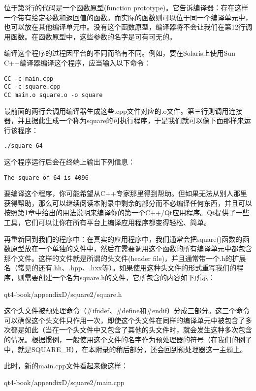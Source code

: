 \documentclass[11pt,oneside]{book}
\begin{document}
\begin{common-format}
位于第3行的代码是一个函数原型(function prototype)。它告诉编译器：存在这样一个带有给定参数和返回值的函数。而实际的函数则可以位于同一个编译单元中，也可以放在其他编译单元中。没有这个函数原型，编译器将不会让我们在第12行调用函数。在函数原型中，这些参数的名字是可有可无的。

编译这个程序的过程因平台的不同而略有不同。例如，要在Solaris上使用Sun C++编译器编译这个程序，应当输入以下命令：
\begin{Verbatim}
CC -c main.cpp
CC -c square.cpp
CC main.o square.o -o square
\end{Verbatim}

最前面的两行会调用编译器生成这些.cpp文件对应的.o文件。第三行则调用连接器，并且据此生成一个称为square的可执行程序，于是我们就可以像下面那样来运行该程序：
\begin{Verbatim}
./square 64
\end{Verbatim}

这个程序运行后会在终端上输出下列信息：
\begin{Verbatim}
The square of 64 is 4096
\end{Verbatim}

要编译这个程序，你可能希望从C++专家那里得到帮助。但如果无法从别人那里获得帮助，那么可以继续阅读本附录中剩余的部分而不必编译任何东西，并且可以按照第1章中给出的用法说明来编译你的第一个C++/Qt应用程序。Qt提供了一些工具，它们可以让你在所有平台上编译应用程序都变得轻松、简单。

再重新回到我们的程序中：在真实的应用程序中，我们通常会把square()函数的函数原型放在一个单独的文件中，然后在需要调用这个函数的所有编译单元中都包含那个文件。这样的文件就是所谓的头文件(header file)，并且通常带一个.h的扩展名（常见的还有.hh、.hpp、.hxx等）。如果使用这种头文件的形式重写我们的程序，则需要创建一个名为square.h的文件，它所包含的内容如下所示：

\begin{cppinput}{qt4-book/appendixD/square2/square.h}
\end{cppinput}

这个头文件被预处理命令（\#{}ifndef、\#{}define和\#{}endif）分成三部分。这三个命令可以确保这个头文件只作用一次，即使这个头文件在同样的编译单元中被包含了多次都是如此（当在一个头文件中又包含了其他的头文件时，就会发生这种多次包含的情况。根据惯例，一般使用这个文件的名字作为预处理器的符号（在我们的例子中，就是SQUARE\_{}H），在本附录的稍后部分，还会回到预处理器这一主题上。

此时，新的main.cpp文件看起来像这样：
\begin{cppinput}{qt4-book/appendixD/square2/main.cpp}
\end{cppinput}


\end{common-format}
\end{document}
